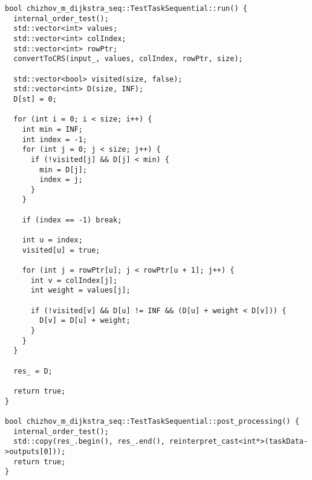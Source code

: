 \documentclass[a4paper, 14pt]{extarticle}
\begin{document}
\begin{lstlisting}
bool chizhov_m_dijkstra_seq::TestTaskSequential::run() {
  internal_order_test();
  std::vector<int> values;
  std::vector<int> colIndex;
  std::vector<int> rowPtr;
  convertToCRS(input_, values, colIndex, rowPtr, size);

  std::vector<bool> visited(size, false);
  std::vector<int> D(size, INF);
  D[st] = 0;

  for (int i = 0; i < size; i++) {
    int min = INF;
    int index = -1;
    for (int j = 0; j < size; j++) {
      if (!visited[j] && D[j] < min) {
        min = D[j];
        index = j;
      }
    }

    if (index == -1) break;

    int u = index;
    visited[u] = true;

    for (int j = rowPtr[u]; j < rowPtr[u + 1]; j++) {
      int v = colIndex[j];
      int weight = values[j];

      if (!visited[v] && D[u] != INF && (D[u] + weight < D[v])) {
        D[v] = D[u] + weight;
      }
    }
  }

  res_ = D;

  return true;
}

bool chizhov_m_dijkstra_seq::TestTaskSequential::post_processing() {
  internal_order_test();
  std::copy(res_.begin(), res_.end(), reinterpret_cast<int*>(taskData->outputs[0]));
  return true;
}

\end{lstlisting}
	
\end{document}
